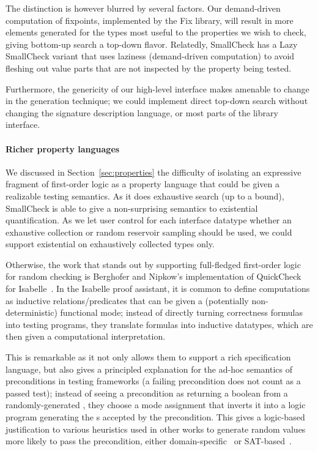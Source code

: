 The distinction is however blurred by several factors. Our
demand-driven computation of fixpoints, implemented by the Fix
library, will result in more elements generated for the types most
useful to the properties we wish to check, giving bottom-up search
a top-down flavor. Relatedly, SmallCheck has a Lazy SmallCheck variant
that uses laziness (demand-driven computation) to avoid fleshing out
value parts that are not inspected by the property being tested.

Furthermore, the genericity of our high-level interface makes
 amenable to change in the generation technique; we
could implement direct top-down search without changing the signature
description language, or most parts of the library interface.

\paragraph{Richer property languages}

We discussed in Section~\ref{sec:properties} the difficulty of
isolating an expressive fragment of first-order logic as a property
language that could be given a realizable testing semantics. As it
does exhaustive search (up to a bound), SmallCheck is able to give
a non-surprising semantics to existential quantification. As we let
user control for each interface datatype whether an exhaustive
collection or random reservoir sampling should be used, we could
support existential on exhaustively collected types only.

Otherwise, the work that stands out by supporting full-fledged
first-order logic for random checking is Berghofer and Nipkow's
implementation of QuickCheck for
Isabelle~\cite{DBLP:conf/sefm/BerghoferN04}. In the Isabelle proof
assistant, it is common to define computations as inductive
relations/predicates that can be given a (potentially
non-deterministic) functional mode; instead of directly turning
correctness formulas into testing programs, they translate formulas
into inductive datatypes, which are then given a computational
interpretation.

This is remarkable as it not only allows them to support a rich
specification language, but also gives a principled explanation for
the ad-hoc semantics of preconditions in testing frameworks (a failing
precondition does not count as a passed test); instead of seeing
a precondition  as returning a boolean from
a randomly-generated , they choose a mode assignment that
inverts it into a logic program generating the s accepted by
the precondition. This gives a logic-based justification to various
heuristics used in other works to generate random values more likely
to pass the precondition, either
domain-specific~\cite{DBLP:conf/tap/ClaessenS08} or
  SAT-based~\cite{DBLP:conf/tap/AhnD10}.
